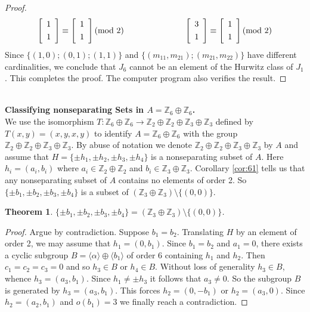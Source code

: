 \documentclass[article,dvisp]{amsart}
\def\Z{\mathbb{Z}}
\newtheorem{thm}{Theorem}[section]
\theoremstyle{definition}
\theoremstyle{remark}
\numberwithin{equation}{section}
\theoremstyle{lemma}
\begin{document}
\begin{proof}
 $$\left[{\begin{array}{*{20}c}
    1\vspace{.05in}\\
    1 
 \end{array}}\right]\equiv\left[{\begin{array}{*{20}c}
    1 \vspace{.05in}\\
    1
 \end{array}}\right](\text{mod}\ 2)\hspace{1in} 
 \left[{\begin{array}{*{20}c}
    3\vspace{.05in}\\
    1 
 \end{array}}\right]\equiv\left[{\begin{array}{*{20}c}
    1 \vspace{.05in}\\
    1
 \end{array}}\right](\text{mod}\ 2)
 $$
Since $\{(1,0);(0,1);(1,1)\}$ and $\{(m_{11},m_{21});(m_{21},m_{22})\}$ have different cardinalities, we conclude that $J_{6}$ cannot be an element of the Hurwitz class of $J_{1}$. This completes the proof. The computer program also verifies the result.\end{proof}\
\\
\textbf{Classifying nonseparating Sets in $A=\Z_{6}\oplus\Z_{6}$.}\vspace{.05in}\\
We use the isomorphism $T:\Z_{6}\oplus \Z_{6}\to\Z_{2}\oplus\Z_{2}\oplus \Z_{3}\oplus\Z_{3}$ defined by $T(x,y)=(x,y,x,y)$ to identify $A=\Z_{6}\oplus \Z_{6}$ with the group $\Z_{2}\oplus\Z_{2}\oplus \Z_{3}\oplus \Z_{3}$. By abuse of notation we denote $\Z_{2}\oplus \Z_{2}\oplus \Z_{3}\oplus \Z_{3}$ by $A$ and assume that $H=\{\pm h_{1},\pm h_{2},\pm h_{3},\pm h_{4}\}$ is a nonseparating subset of $A$. Here $h_{i}=(a_{i},b_{i})$ where $a_{i}\in\Z_{2}\oplus \Z_{2}$ and $b_{i}\in\Z_{3}\oplus\Z_{3}$. Corollary \ref{cor:61} tells us that any nonseparating subset of $A$  contains no elements of order 2. So $\{\pm b_{1},\pm b_{2},\pm b_{3},\pm b_{4}\}$ is a subset of $(\Z_{3}\oplus \Z_{3})\setminus\{(0,0)\}$.\\
\begin{thm} $\{\pm b_{1},\pm b_{2},\pm b_{3},\pm b_{4}\}=(\Z_{3}\oplus \Z_{3})\setminus\{(0,0)\}$.\end{thm}
\begin{proof} Argue by contradiction. Suppose $b_{1}=b_{2}$. Translating $H$ by an element of order 2, we may assume that $h_{1}=(0,b_{1})$. Since $b_{1}=b_{2}$ and $a_{1}=0$, there exists a cyclic subgroup $B=\langle \alpha\rangle\oplus\langle b_{1}\rangle$ of order 6 containing $h_{1}$ and $h_{2}$. Then $c_{1}=c_{2}=c_{3}=0$ and so $h_{3}\in B$ or $h_{4}\in B$. Without loss of generality $h_{3}\in B$, whence $h_{3}=(a_{3},b_{1})$. Since $h_{1}\neq\pm h_{3}$ it follows that $a_{3}\neq0$. So the subgroup $B$ is generated by $h_{3}=(a_{3},b_{1})$. This forces $h_{2}=(0,-b_{1})$ or $h_{2}=(a_{3},0)$. Since $h_{2}=(a_{2},b_{1})$ and $o(b_{1})=3$ we finally reach a contradiction.\end{proof}\
\end{document}
